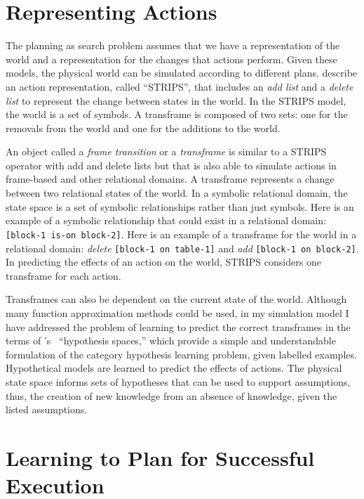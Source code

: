 \section{Representing Actions}

The planning as search problem assumes that we have a representation
of the world and a representation for the changes that actions
perform.  Given these models, the physical world can be simulated
according to different plans.  \cite{fikes:1972} describe an action
representation, called ``STRIPS'', that includes an \emph{add list}
and a \emph{delete list} to represent the change between states in the
world.  In the STRIPS model, the world is a set of symbols.  A
transframe is composed of two sets: one for the removals from the
world and one for the additions to the world.

An object called a \emph{frame transition} \cite[]{minsky:1975} or a
\emph{transframe} \cite[]{minsky:1988} is similar to a STRIPS operator
with add and delete lists but that is also able to simulate actions in
frame-based and other relational domains.  A transframe represents a
change between two relational states of the world.  In a symbolic
relational domain, the state space is a set of symbolic relationships
rather than just symbols.  Here is an example of a symbolic
relationship that could exist in a relational domain: {\tt [block-1
    is-on block-2]}.  Here is an example of a transframe for the world
in a relational domain: \emph{delete} {\tt [block-1 on table-1]} and
\emph{add} {\tt [block-1 on block-2]}.  In predicting the effects of
an action on the world, STRIPS considers one transframe for each
action.

Transframes can also be dependent on the current state of the world.
Although many function approximation methods could be used, in my
simulation model I have addressed the problem of learning to predict
the correct transframes in the terms of
{\mbox{\citeauthor{mitchell:1997}'s~\citeyearpar{mitchell:1997}}}
``hypothesis spaces,'' which provide a simple and understandable
formulation of the category hypothesis learning problem, given
labelled examples.  Hypothetical models are learned to predict the
effects of actions.  The physical state space informs sets of
hypotheses that can be used to support assumptions, thus, the creation
of new knowledge from an absence of knowledge, given the listed
assumptions.

\section{Learning to Plan for Successful Execution}

